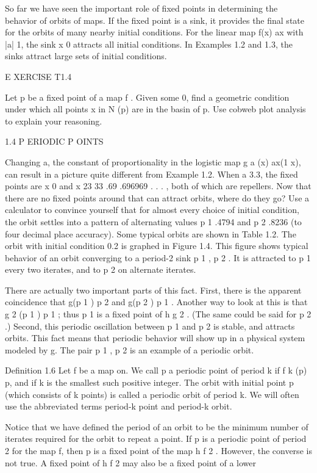 \documentclass[12pt]{article}
\begin{document}
So far we have seen the important role of fixed points in determining the behavior of orbits of maps. If 
the fixed point is a sink, it provides the final state for the orbits of many nearby initial conditions. 
For the linear map f(x)  ax with |a|  1, the sink x  0 attracts all initial conditions. In Examples 1.2 and 
1.3, the sinks attract large sets of initial conditions.

 

E XERCISE T1.4

Let p be a fixed point of a map f . Given some  
 0, find a geometric condition under which all points x in N  (p) are in the basin of p. Use cobweb plot 
analysis to explain your reasoning.

1.4 P ERIODIC P OINTS

Changing a, the constant of proportionality in the logistic map g a (x)  ax(1  x), can result in a picture 
quite different from Example 1.2. When a  3.3, the fixed points are x  0 and x  23  33  .69  .696969 . . . 
, both of which are repellers. Now that there are no fixed points around that can attract orbits, where do 
they go? Use a calculator to convince yourself that for almost every choice of initial condition, the orbit 
settles into a pattern of alternating values p 1  .4794 and p 2  .8236 (to four decimal place accuracy). 
Some typical orbits are shown in Table 1.2. The orbit with initial condition 0.2 is graphed in Figure 1.4. 
This figure shows typical behavior of an orbit converging to a period-2 sink p 1 , p 2  . It is attracted 
to p 1 every two iterates, and to p 2 on alternate iterates.

There are actually two important parts of this fact. First, there is the apparent coincidence that g(p 1 )  
p 2 and g(p 2 )  p 1 . Another way to look at this is that g 2 (p 1 )  p 1 ; thus p 1 is a fixed point of h  
g 2 . (The same could be said for p 2 .) Second, this periodic oscillation between p 1 and p 2 is stable, 
and attracts orbits. This fact means that periodic behavior will show up in a physical system modeled by g. 
The pair p 1 , p 2  is an example of a periodic orbit.

Definition 1.6 Let f be a map on. We call p a periodic point of period k if f k (p)  p, and if k is the 
smallest such positive integer. The orbit with initial point p (which consists of k points) is called a 
periodic orbit of period k. We will often use the abbreviated terms period-k point and period-k orbit.

Notice that we have defined the period of an orbit to be the minimum number of iterates required for the 
orbit to repeat a point. If p is a periodic point of period 2 for the map f, then p is a fixed point of the 
map h  f 2 . However, the converse is not true. A fixed point of h  f 2 may also be a fixed point of a 
lower
\end{document}
